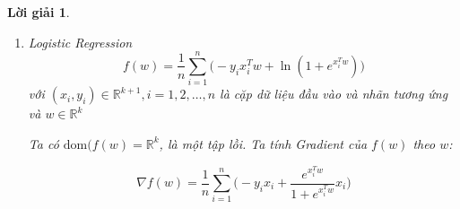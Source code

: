 \documentclass[14pt, a4paper]{article}
\theoremstyle{sltheorem}
\theoremstyle{soltheorem}
\newtheorem*{loigiai}{Lời giải}
\begin{document}
\begin{loigiai}
\begin{enumerate} [wide, labelwidth=!, labelindent=0pt,label=\textbf{\arabic*}.]
            Ta tính ma trận Hessian của $\lVert Ax - b \rVert_2^2$ theo $x$:
            \begin{equation*}
                \nabla^2 \lVert Ax - b \rVert_2^2=2A^TA
            \end{equation*}

            Ta xét:

            \begin{equation*}
                2p^TA^TAp=2(Ap)^TAp\geq0 \thickspace \forall p \in \mathbb{R}^{n} \Rightarrow 2A^TA \succeq 0
            \end{equation*}

            Mặt khác, $\mathrm{dom}(\lVert Ax - b \rVert_2^2)=\mathbb{R}^n$ là tập lồi. Vậy nên $\lVert Ax - b \rVert_2^2$ là hàm lồi

            Ta chứng minh $\lVert x \rVert_1$ là hàm lồi, với $\theta \in \lbrack 0, 1\rbrack, x,y \in \mathbb{R}^n$:

            \begin{equation*}
                \begin{aligned}
                    \lVert \theta x + (1-\theta)y \rVert_1 \leq \theta \lVert x \rVert_1 + (1-\theta)\lVert y \rVert_1 \thickspace \forall \thickspace \theta \in \lbrack 0, 1 \rbrack, x, y \in \mathbb{R}^n
                \end{aligned}
            \end{equation*}

            theo bất đẳng thức tam giác và $\mathrm{dom}(\lVert x \rVert_1)=\mathbb{R}^n$ là tập lồi nên $\lVert x \rVert_1$ là hàm lồi. 
            $\mathrm{dom}(f)$ là một tập lồi và tổng của hai hàm lồi là một hàm lồi nên $f(x)$ là một hàm lồi.

            \item Logistic Regression
            \begin{equation*}
                f(w)=\dfrac{1}{n}\sum_{i=1}^n \Big( -y_i x_i^T w + \ln(1 + e^{x_i^T w}) \Big)
            \end{equation*}
            với $(x_i, y_i) \in \mathbb{R}^{k+1},i=1,2,\dots,n$ là cặp dữ liệu đầu vào và nhãn tương ứng và $w \in \mathbb{R}^k$

            Ta có $\mathrm{dom}(f(w)=\mathbb{R}^{k}$, là một tập lồi. Ta tính Gradient của $f(w)$ theo $w$:

            \begin{equation*}
                \nabla f(w)=\dfrac{1}{n}\sum_{i=1}^n \Big( -y_i x_i + \dfrac{e^{x_i^Tw}}{1 + e^{x_i^T w}}x_i \Big)
            \end{equation*}


\end{enumerate}
\end{loigiai}
\end{document}
